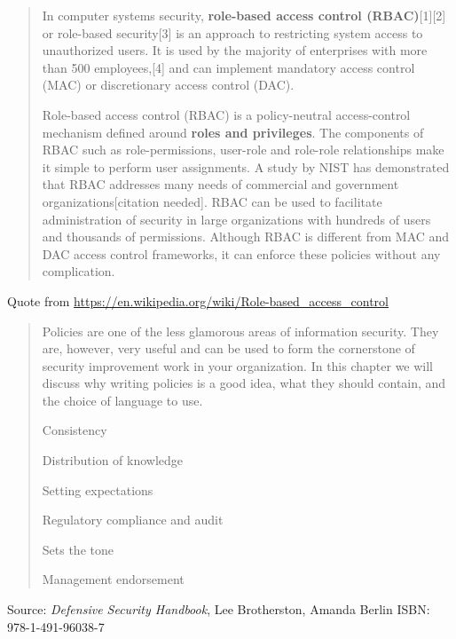 \documentclass[Screen16to9,17pt]{foils}
\begin{document}
\begin{quote}
In computer systems security, {\bf role-based access control (RBAC)}[1][2] or role-based security[3] is an approach to restricting system access to unauthorized users. It is used by the majority of enterprises with more than 500 employees,[4] and can implement mandatory access control (MAC) or discretionary access control (DAC).

Role-based access control (RBAC) is a policy-neutral access-control mechanism defined around {\bf roles and privileges}. The components of RBAC such as role-permissions, user-role and role-role relationships make it simple to perform user assignments. A study by NIST has demonstrated that RBAC addresses many needs of commercial and government organizations[citation needed]. RBAC can be used to facilitate administration of security in large organizations with hundreds of users and thousands of permissions. Although RBAC is different from MAC and DAC access control frameworks, it can enforce these policies without any complication.
\end{quote}
Quote from \url{https://en.wikipedia.org/wiki/Role-based_access_control}






\begin{quote}
Policies are one of the less glamorous areas of information security. They are, however, very useful and can be used to form the cornerstone of security improvement work in your organization. In this chapter we will discuss why writing policies is a good idea, what they should contain, and the choice of language to use.
\begin{list2}
\item Consistency
\item Distribution of knowledge
\item Setting expectations
\item Regulatory compliance and audit
\item Sets the tone
\item Management endorsement
\end{list2}
\end{quote}
Source: \emph{Defensive Security Handbook}, Lee Brotherston, Amanda Berlin ISBN: 978-1-491-96038-7




\end{document}
